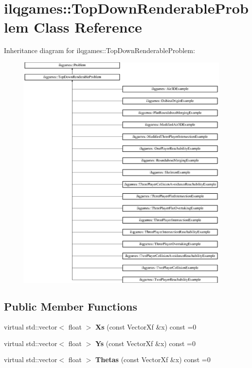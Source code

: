 \hypertarget{classilqgames_1_1_top_down_renderable_problem}{}\section{ilqgames\+:\+:Top\+Down\+Renderable\+Problem Class Reference}
\label{classilqgames_1_1_top_down_renderable_problem}
Inheritance diagram for ilqgames\+:\+:Top\+Down\+Renderable\+Problem\+:\begin{figure}[H]
\begin{center}
\leavevmode
\includegraphics[height=12.000000cm]{classilqgames_1_1_top_down_renderable_problem}
\end{center}
\end{figure}
\subsection*{Public Member Functions}
\begin{DoxyCompactItemize}
\item 
virtual std\+::vector$<$ float $>$ {\bfseries Xs} (const Vector\+Xf \&x) const =0\hypertarget{classilqgames_1_1_top_down_renderable_problem_aecfc819c7a5f9f2a641fcfea8a96ce3b}{}\label{classilqgames_1_1_top_down_renderable_problem_aecfc819c7a5f9f2a641fcfea8a96ce3b}

\item 
virtual std\+::vector$<$ float $>$ {\bfseries Ys} (const Vector\+Xf \&x) const =0\hypertarget{classilqgames_1_1_top_down_renderable_problem_a702009371be24e0143afb1dbc80f46c4}{}\label{classilqgames_1_1_top_down_renderable_problem_a702009371be24e0143afb1dbc80f46c4}

\item 
virtual std\+::vector$<$ float $>$ {\bfseries Thetas} (const Vector\+Xf \&x) const =0\hypertarget{classilqgames_1_1_top_down_renderable_problem_a9f128739ad2503ae4e18b4ccfc0c8f33}{}\label{classilqgames_1_1_top_down_renderable_problem_a9f128739ad2503ae4e18b4ccfc0c8f33}

\end{DoxyCompactItemize}
